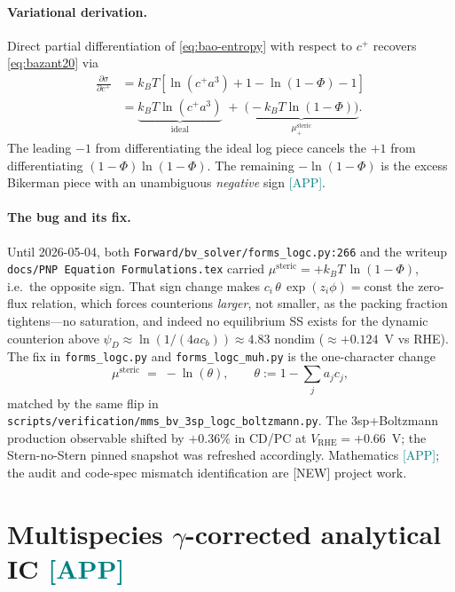 \documentclass[11pt]{article}
\newcommand{\app}{\textcolor{teal}{[APP]}}
\newcommand{\new}{\textcolor{red!70!black}{[NEW]}}
\newcommand{\msteric}{\mu^{\mathrm{steric}}}
\begin{document}
\paragraph{Variational derivation.}
Direct partial differentiation of \eqref{eq:bao-entropy} with respect
to $c^+$ recovers \eqref{eq:bazant20} via
\begin{align}
  \frac{\partial\sigma}{\partial c^+}
   &= k_B T\!\left[\ln(c^+a^3)+1
       - \ln(1-\Phi) - 1\right]\nonumber\\
   &= \underbrace{k_B T \ln(c^+a^3)}_{\text{ideal}}
       \;+\; \underbrace{\bigl(-k_B T \ln(1-\Phi)\bigr)}_{\msteric_+}.
  \label{eq:dsigma-dc}
\end{align}
The leading $-1$ from differentiating the ideal log piece cancels the
$+1$ from differentiating $(1-\Phi)\ln(1-\Phi)$.  The remaining
$-\ln(1-\Phi)$ is the excess Bikerman piece with an unambiguous
\emph{negative} sign \app{}.

\paragraph{The bug and its fix.}
Until 2026-05-04, both \texttt{Forward/bv\_solver/forms\_logc.py:266}
and the writeup \texttt{docs/PNP Equation Formulations.tex} carried
\(\msteric = +k_B T\,\ln(1-\Phi)\), i.e.\ the opposite sign.
That sign change makes \(c_i\,\theta\,\exp(z_i\phi) = \mathrm{const}\)
the zero-flux relation, which forces counterions \emph{larger}, not
smaller, as the packing fraction tightens---no saturation, and
indeed no equilibrium SS exists for the dynamic counterion above
\(\psi_D \approx \ln(1/(4 a c_b))\approx 4.83\) nondim
($\approx +0.124$~V vs RHE).
The fix in \texttt{forms\_logc.py} and \texttt{forms\_logc\_muh.py}
is the one-character change
\begin{equation}
  \msteric \;=\; -\ln(\theta), \qquad \theta := 1-\sum_j a_j c_j,
  \label{eq:musteric-fixed}
\end{equation}
matched by the same flip in
\texttt{scripts/verification/mms\_bv\_3sp\_logc\_boltzmann.py}.  The
3sp+Boltzmann production observable shifted by $+0.36\%$ in CD/PC at
$V_{\mathrm{RHE}}=+0.66$~V; the Stern-no-Stern pinned snapshot was
refreshed accordingly.  Mathematics \app{}; the audit and code-spec
mismatch identification are \new{} project work.

\section{Multispecies $\gamma$-corrected analytical IC \app}
\label{sec:gamma-IC}
\end{document}
